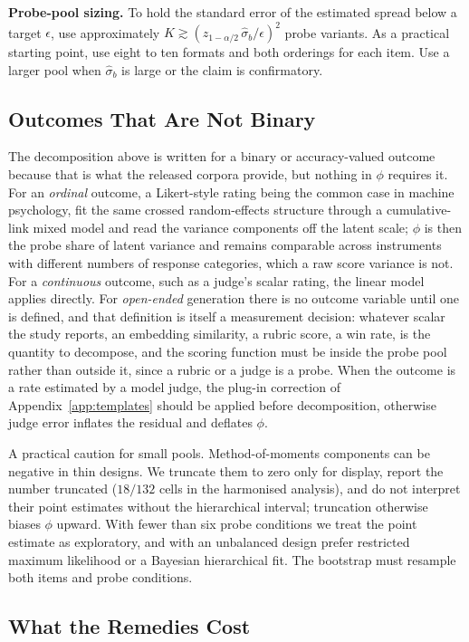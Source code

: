 \documentclass[11pt]{article}
\begin{document}
\textbf{Probe-pool sizing.} To hold the standard error of the estimated spread
below a target $\epsilon$, use approximately
$K\gtrsim(z_{1-\alpha/2}\,\hat\sigma_b/\epsilon)^2$ probe variants. As a practical
starting point, use eight to ten formats and both orderings for each item. Use a
larger pool when $\hat\sigma_b$ is large or the claim is confirmatory.

\subsection{Outcomes That Are Not Binary}
\label{app:phiordinal}

The decomposition above is written for a binary or accuracy-valued outcome
because that is what the released corpora provide, but nothing in $\phi$ requires
it. For an \emph{ordinal} outcome, a Likert-style rating being the common case in
machine psychology, fit the same crossed random-effects structure through a
cumulative-link mixed model and read the variance components off the latent
scale; $\phi$ is then the probe share of latent variance and remains comparable
across instruments with different numbers of response categories, which a raw
score variance is not. For a \emph{continuous} outcome, such as a judge's scalar
rating, the linear model applies directly. For \emph{open-ended} generation there
is no outcome variable until one is defined, and that definition is itself a
measurement decision: whatever scalar the study reports, an embedding similarity,
a rubric score, a win rate, is the quantity to decompose, and the scoring
function must be inside the probe pool rather than outside it, since a rubric or
a judge is a probe. When the outcome is a rate estimated by a model judge, the
plug-in correction of Appendix~\ref{app:templates} should be applied before
decomposition, otherwise judge error inflates the residual and deflates $\phi$.

A practical caution for small pools. Method-of-moments components can be
negative in thin designs. We truncate them to zero only for display, report the
number truncated ($18/132$ cells in the harmonised analysis), and do not interpret
their point estimates without the hierarchical interval; truncation otherwise
biases $\phi$ upward. With fewer than six probe conditions we treat the point
estimate as exploratory, and with an unbalanced design prefer restricted maximum
likelihood or a Bayesian hierarchical fit. The bootstrap must resample both
items and probe conditions.

\subsection{What the Remedies Cost}
\label{app:cost}
\end{document}
